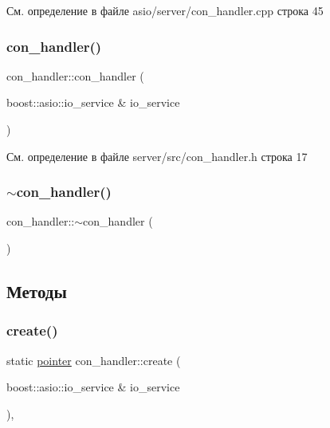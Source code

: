 См. определение в файле asio/server/con\+\_\+handler.\+cpp строка 45

\mbox{\label{classcon__handler_a18e7e450430ebe71687a0fd0c79507aa}} 
\subsubsection{\texorpdfstring{con\_handler()}{con\_handler()}\hspace{0.1cm}{\footnotesize\ttfamily [2/2]}}
{\footnotesize\ttfamily con\+\_\+handler\+::con\+\_\+handler (\begin{DoxyParamCaption}\item[{boost\+::asio\+::io\+\_\+service \&}]{io\+\_\+service }\end{DoxyParamCaption})\hspace{0.3cm}{\ttfamily [inline]}}



См. определение в файле server/src/con\+\_\+handler.\+h строка 17

\mbox{\label{classcon__handler_aa1bc82c764eb633355a52bd77689ed3f}} 
\subsubsection{\texorpdfstring{$\sim$con\_handler()}{~con\_handler()}\hspace{0.1cm}{\footnotesize\ttfamily [2/2]}}
{\footnotesize\ttfamily con\+\_\+handler\+::$\sim$con\+\_\+handler (\begin{DoxyParamCaption}{ }\end{DoxyParamCaption})}



\subsection{Методы}
\mbox{\label{classcon__handler_ab3cec40540ef3ff484ef0b639545eb17}} 
\subsubsection{\texorpdfstring{create()}{create()}\hspace{0.1cm}{\footnotesize\ttfamily [1/2]}}
{\footnotesize\ttfamily static \mbox{\hyperlink{classcon__handler_ada4a1b970f9fd8e55460a58cf7f7ce2c}{pointer}} con\+\_\+handler\+::create (\begin{DoxyParamCaption}\item[{boost\+::asio\+::io\+\_\+service \&}]{io\+\_\+service }\end{DoxyParamCaption})\hspace{0.3cm}{\ttfamily [inline]}, {\ttfamily [static]}}



